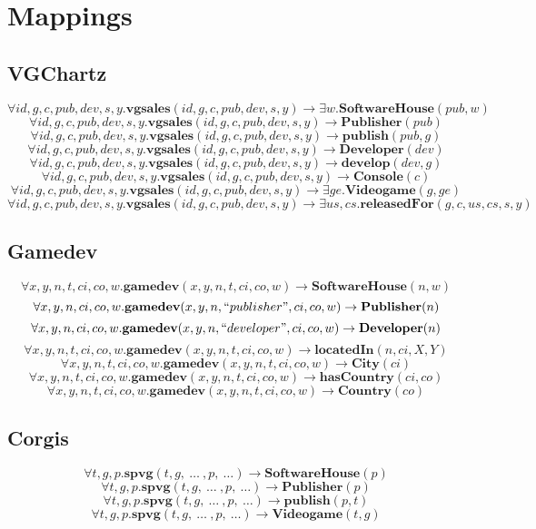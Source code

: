 \section{Mappings}
\subsection*{VGChartz}
\[ \forall id,g,c,pub,dev,s,y.\textbf{vgsales}(id,g,c,pub,dev,s,y)\rightarrow \exists w.\textbf{SoftwareHouse}(pub,w) \]
\[ \forall id,g,c,pub,dev,s,y.\textbf{vgsales}(id,g,c,pub,dev,s,y)\rightarrow \textbf{Publisher}(pub) \]
\[ \forall id,g,c,pub,dev,s,y.\textbf{vgsales}(id,g,c,pub,dev,s,y)\rightarrow \textbf{publish}(pub,g) \]
\[ \forall id,g,c,pub,dev,s,y.\textbf{vgsales}(id,g,c,pub,dev,s,y)\rightarrow \textbf{Developer}(dev) \]
\[ \forall id,g,c,pub,dev,s,y.\textbf{vgsales}(id,g,c,pub,dev,s,y)\rightarrow \textbf{develop}(dev,g) \]
\[ \forall id,g,c,pub,dev,s,y.\textbf{vgsales}(id,g,c,pub,dev,s,y)\rightarrow \textbf{Console}(c) \]
\[ \forall id,g,c,pub,dev,s,y.\textbf{vgsales}(id,g,c,pub,dev,s,y)\rightarrow \exists ge.\textbf{Videogame}(g,ge) \]
\[ \forall id,g,c,pub,dev,s,y.\textbf{vgsales}(id,g,c,pub,dev,s,y)\rightarrow \exists us,cs.\textbf{releasedFor}(g,c,us,cs,s,y) \]

\subsection*{Gamedev}
\[ \forall x,y,n,t,ci,co,w.\textbf{gamedev}(x, y, n, t, ci, co, w) \rightarrow \textbf{SoftwareHouse}(n,w) \]
\[ \forall x,y,n,ci,co,w.\textbf{gamedev}(x, y, n, ``publisher", ci, co, w) \rightarrow \textbf{Publisher}(n) \]
\[ \forall x,y,n,ci,co,w.\textbf{gamedev}(x, y, n, ``developer", ci, co, w) \rightarrow \textbf{Developer}(n) \]
\[ \forall x,y,n,t,ci,co,w.\textbf{gamedev}(x, y, n, t, ci, co, w) \rightarrow \textbf{locatedIn}(n,ci, X, Y) \]
\[ \forall x,y,n,t,ci,co,w.\textbf{gamedev}(x, y, n, t, ci, co, w) \rightarrow \textbf{City}(ci) \]
\[ \forall x,y,n,t,ci,co,w.\textbf{gamedev}(x, y, n, t, ci, co, w) \rightarrow \textbf{hasCountry}(ci, co) \]
\[ \forall x,y,n,t,ci,co,w.\textbf{gamedev}(x, y, n, t, ci, co, w) \rightarrow \textbf{Country}(co) \]

\subsection*{Corgis}
\[ \forall t,g,p.\textbf{spvg}(t,g,\ …\ ,p,\ …) \rightarrow \textbf{SoftwareHouse}(p) \]
\[ \forall t,g,p.\textbf{spvg}(t,g,\ …\ ,p,\ …) \rightarrow \textbf{Publisher}(p) \]
\[ \forall t,g,p.\textbf{spvg}(t,g,\ …\ ,p,\ …) \rightarrow \textbf{publish}(p,t) \]
\[ \forall t,g,p.\textbf{spvg}(t,g,\ …\ ,p,\ …) \rightarrow \textbf{Videogame}(t,g) \]

